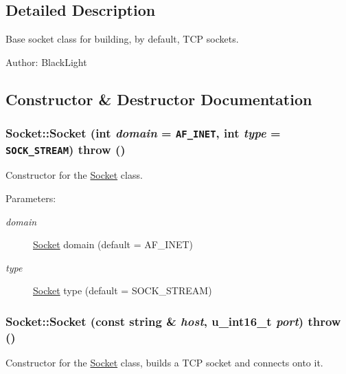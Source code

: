 \subsection{Detailed Description}
Base socket class for building, by default, TCP sockets. 

\begin{Desc}
\item[Author:]BlackLight \end{Desc}


\subsection{Constructor \& Destructor Documentation}
\hypertarget{classSocket_08ec85e71ecfde6ee952624696b3e1cb}{
\subsubsection[{Socket}]{\setlength{\rightskip}{0pt plus 5cm}Socket::Socket (int {\em domain} = {\tt AF\_\-INET}, \/  int {\em type} = {\tt SOCK\_\-STREAM})  throw ()}}
\label{classSocket_08ec85e71ecfde6ee952624696b3e1cb}


Constructor for the \hyperlink{classSocket}{Socket} class. 

\begin{Desc}
\item[Parameters:]
\begin{description}
\item[{\em domain}]\hyperlink{classSocket}{Socket} domain (default = AF\_\-INET) \item[{\em type}]\hyperlink{classSocket}{Socket} type (default = SOCK\_\-STREAM) \end{description}
\end{Desc}
\hypertarget{classSocket_b1d662fa225adb4d63ca40b0747496a7}{
\subsubsection[{Socket}]{\setlength{\rightskip}{0pt plus 5cm}Socket::Socket (const string \& {\em host}, \/  u\_\-int16\_\-t {\em port})  throw ()}}
\label{classSocket_b1d662fa225adb4d63ca40b0747496a7}


Constructor for the \hyperlink{classSocket}{Socket} class, builds a TCP socket and connects onto it. 

